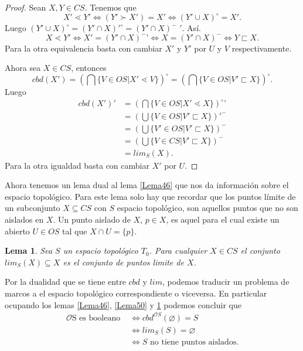 \documentclass[12pt,letterpaper,titlepage]{article}
\let\emptyset\varnothing
\newtheorem{lemma}{Lema}
\theoremstyle{definition}
\newcommand\<{\langle}
\renewcommand\>{\rangle}
\begin{document}
\begin{proof}
Sean $X, Y\in CS$. Tenemos que $$X'\lessdot Y'\Leftrightarrow (Y'\succ X')=X'\Leftrightarrow (Y'\cup X)^\circ=X'.$$
Luego $(Y'\cup X)^\circ=(Y'\cap X)'^\circ =(Y'\cap X)^-$ $'$. Así. $$X\lessdot Y'\Leftrightarrow X'=(Y'\cap X)^-\mbox{'}\Leftrightarrow X=(Y'\cap X)^-\Leftrightarrow Y\sqsubset X.$$
Para la otra equivalencia basta con cambiar $X'$ y $Y'$ por $U$ y $V$ respectivamente.

Ahora sea $X\in CS$, entonces $$cbd(X')=\left(\bigcap\{V\in OS| X'\lessdot V\}\right)^\circ=\left(\bigcap\{V\in OS|V'\sqsubset X\}\right)^\circ.$$
Luego 
\begin{equation*}
\begin{split}
cbd(X')' &=\left(\bigcap\{V\in OS| X'\lessdot X\}\right)^\circ \mbox{'}\\
& =\left(\bigcup\{V\in OS|V'\sqsubset X\}\right)'^-\\
& =\left(\bigcup\{V'\in OS|V'\sqsubset X\}\right)^-\\
& =\left(\bigcup\{V\in CS|V'\sqsubset X\}\right)^-\\
& =lim_S(X).
\end{split}
\end{equation*}
Para la otra igualdad basta con cambiar $X'$ por $U$.
\end{proof}

Ahora tenemos un lema dual al lema \ref{Lema46} que nos da información sobre el espacio topológico. Para este lema solo hay que recordar que los puntos límite de un subconjunto $X\subseteq CS$ con $S$ espacio topológico, son aquellos puntos que no son aislados en $X$. Un punto aislado de $X$, $p\in X$, es aquel para el cual existe un abierto $U\in OS$ tal que $X\cap U=\{p\}$.

\begin{lemma}\label{Lema51}
Sea $S$ un espacio topológico $T_0$. Para cualquier $X\in CS$ el conjunto $lim_S(X)\subseteq X$ es el conjunto de puntos limite de $X$.
\end{lemma}

Por la dualidad que se tiene entre $cbd$ y $lim$, podemos traducir un problema de marcos a el espacio topológico correspondiente o viceversa. En particular ocupando los lemas \ref{Lema46}, \ref{Lema50} y \ref{Lema51} podemos concluir que 
\begin{equation*}
\begin{split}
\mathcal{O}\mbox{S es booleano } & \Leftrightarrow cbd^{\mathcal{O}S}(\emptyset)=S\\
& \Leftrightarrow lim_S(S)=\emptyset\\
& \Leftrightarrow S \mbox{ no tiene puntos aislados}.
\end{split}
\end{equation*}
\end{document}
